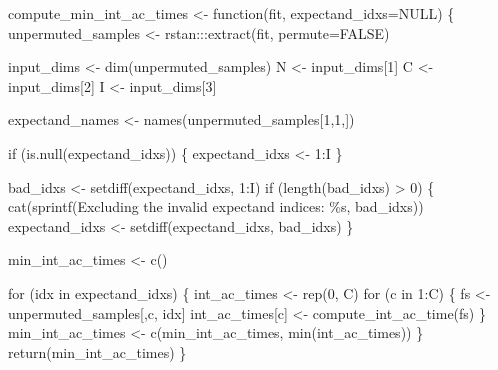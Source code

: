\documentclass[
  letterpaper,
  DIV=11,
  numbers=noendperiod]{scrartcl}
\newenvironment{Shaded}{\begin{snugshade}}{\end{snugshade}}
\newcommand{\AttributeTok}[1]{\textcolor[rgb]{0.40,0.45,0.13}{#1}}
\newcommand{\ConstantTok}[1]{\textcolor[rgb]{0.56,0.35,0.01}{#1}}
\newcommand{\ControlFlowTok}[1]{\textcolor[rgb]{0.00,0.23,0.31}{#1}}
\newcommand{\DecValTok}[1]{\textcolor[rgb]{0.68,0.00,0.00}{#1}}
\newcommand{\FunctionTok}[1]{\textcolor[rgb]{0.28,0.35,0.67}{#1}}
\newcommand{\NormalTok}[1]{\textcolor[rgb]{0.00,0.23,0.31}{#1}}
\newcommand{\OtherTok}[1]{\textcolor[rgb]{0.00,0.23,0.31}{#1}}
\newcommand{\SpecialCharTok}[1]{\textcolor[rgb]{0.37,0.37,0.37}{#1}}
\newcommand{\StringTok}[1]{\textcolor[rgb]{0.13,0.47,0.30}{#1}}
\begin{document}
\begin{Shaded}
\begin{Highlighting}[]
\NormalTok{compute\_min\_int\_ac\_times }\OtherTok{\textless{}{-}} \ControlFlowTok{function}\NormalTok{(fit, }\AttributeTok{expectand\_idxs=}\ConstantTok{NULL}\NormalTok{) \{}
\NormalTok{  unpermuted\_samples }\OtherTok{\textless{}{-}}\NormalTok{ rstan}\SpecialCharTok{:::}\FunctionTok{extract}\NormalTok{(fit, }\AttributeTok{permute=}\ConstantTok{FALSE}\NormalTok{)}

\NormalTok{  input\_dims }\OtherTok{\textless{}{-}} \FunctionTok{dim}\NormalTok{(unpermuted\_samples)}
\NormalTok{  N }\OtherTok{\textless{}{-}}\NormalTok{ input\_dims[}\DecValTok{1}\NormalTok{]}
\NormalTok{  C }\OtherTok{\textless{}{-}}\NormalTok{ input\_dims[}\DecValTok{2}\NormalTok{]}
\NormalTok{  I }\OtherTok{\textless{}{-}}\NormalTok{ input\_dims[}\DecValTok{3}\NormalTok{]}

\NormalTok{  expectand\_names }\OtherTok{\textless{}{-}} \FunctionTok{names}\NormalTok{(unpermuted\_samples[}\DecValTok{1}\NormalTok{,}\DecValTok{1}\NormalTok{,])}

  \ControlFlowTok{if}\NormalTok{ (}\FunctionTok{is.null}\NormalTok{(expectand\_idxs)) \{}
\NormalTok{    expectand\_idxs }\OtherTok{\textless{}{-}} \DecValTok{1}\SpecialCharTok{:}\NormalTok{I}
\NormalTok{  \}}

\NormalTok{  bad\_idxs }\OtherTok{\textless{}{-}} \FunctionTok{setdiff}\NormalTok{(expectand\_idxs, }\DecValTok{1}\SpecialCharTok{:}\NormalTok{I)}
  \ControlFlowTok{if}\NormalTok{ (}\FunctionTok{length}\NormalTok{(bad\_idxs) }\SpecialCharTok{\textgreater{}} \DecValTok{0}\NormalTok{) \{}
    \FunctionTok{cat}\NormalTok{(}\FunctionTok{sprintf}\NormalTok{(}\StringTok{\textquotesingle{}Excluding the invalid expectand indices: \%s\textquotesingle{}}\NormalTok{,}
\NormalTok{                bad\_idxs))}
\NormalTok{    expectand\_idxs }\OtherTok{\textless{}{-}} \FunctionTok{setdiff}\NormalTok{(expectand\_idxs, bad\_idxs)}
\NormalTok{  \}}

\NormalTok{  min\_int\_ac\_times }\OtherTok{\textless{}{-}} \FunctionTok{c}\NormalTok{()}

  \ControlFlowTok{for}\NormalTok{ (idx }\ControlFlowTok{in}\NormalTok{ expectand\_idxs) \{}
\NormalTok{    int\_ac\_times }\OtherTok{\textless{}{-}} \FunctionTok{rep}\NormalTok{(}\DecValTok{0}\NormalTok{, C)}
    \ControlFlowTok{for}\NormalTok{ (c }\ControlFlowTok{in} \DecValTok{1}\SpecialCharTok{:}\NormalTok{C) \{}
\NormalTok{      fs }\OtherTok{\textless{}{-}}\NormalTok{ unpermuted\_samples[,c, idx]}
\NormalTok{      int\_ac\_times[c] }\OtherTok{\textless{}{-}} \FunctionTok{compute\_int\_ac\_time}\NormalTok{(fs)}
\NormalTok{    \}}
\NormalTok{    min\_int\_ac\_times }\OtherTok{\textless{}{-}} \FunctionTok{c}\NormalTok{(min\_int\_ac\_times, }\FunctionTok{min}\NormalTok{(int\_ac\_times))}
\NormalTok{  \}}
  \FunctionTok{return}\NormalTok{(min\_int\_ac\_times)}
\NormalTok{\}}
\end{Highlighting}
\end{Shaded}
\end{document}
